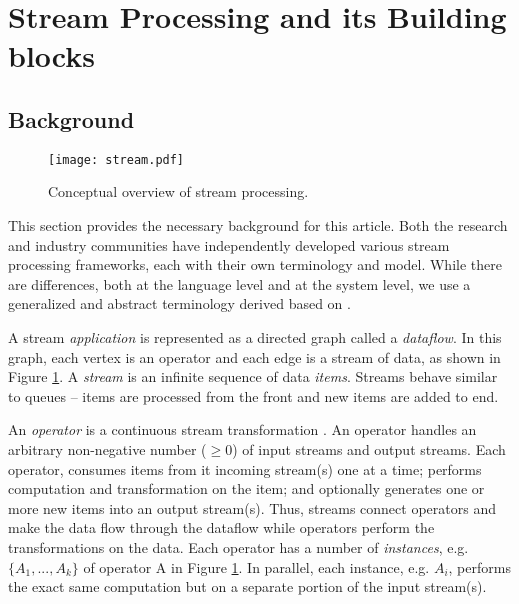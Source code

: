 \section{Stream Processing and its Building blocks}

\subsection{Background}

\begin{figure}[h]
	\centering
	\texttt{[image: stream.pdf]}
	\caption{Conceptual overview of stream processing.}
	\label{fig:stream}
\end{figure}

This section provides the necessary background for this article.
 Both the research and industry communities have independently developed various stream processing frameworks, each with their own terminology and model. While there are differences, both at the language level and at the
system level, we use a generalized and abstract terminology derived based on \cite{optimization-survey}. 

A stream \textit{application} is represented as a directed graph called a \textit{dataflow}. In this graph, each vertex is an operator and each edge is a stream of data, as shown in Figure \ref{fig:stream}.
A \textit{stream} is an infinite sequence of data \textit{items}. Streams behave similar to queues -- items are processed from the front and new items are added to end.

An \textit{operator} is a continuous stream transformation . An operator handles an arbitrary non-negative number ($\geq 0$) of input streams and output streams. Each operator, consumes items from it incoming stream(s) one at a time; performs computation and transformation on the item; and optionally generates one or more new items into an output stream(s). Thus, streams connect operators and make the data flow through the dataflow while operators perform the transformations on the data. 
Each operator has a number of \textit{instances}, e.g. $\{A_1, ..., A_k\}$ of operator A in Figure \ref{fig:stream}. In parallel, each instance, e.g. $A_i$, performs the exact same computation but on a separate portion of the input stream(s).

 



